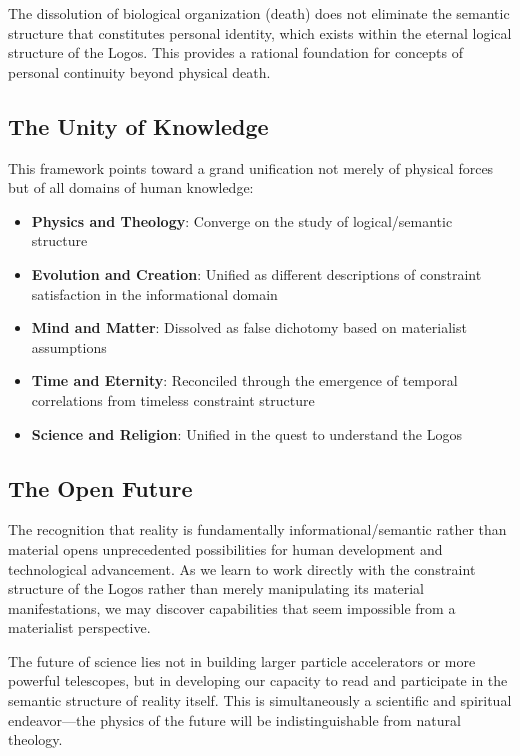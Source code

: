 \documentclass[12pt,a4paper]{article}
\begin{document}
The dissolution of biological organization (death) does not eliminate the semantic structure that constitutes personal identity, which exists within the eternal logical structure of the Logos. This provides a rational foundation for concepts of personal continuity beyond physical death.

\subsection{The Unity of Knowledge}

This framework points toward a grand unification not merely of physical forces but of all domains of human knowledge:

\begin{itemize}
    \item \textbf{Physics and Theology}: Converge on the study of logical/semantic structure
    \item \textbf{Evolution and Creation}: Unified as different descriptions of constraint satisfaction in the informational domain
    \item \textbf{Mind and Matter}: Dissolved as false dichotomy based on materialist assumptions
    \item \textbf{Time and Eternity}: Reconciled through the emergence of temporal correlations from timeless constraint structure
    \item \textbf{Science and Religion}: Unified in the quest to understand the Logos
\end{itemize}

\subsection{The Open Future}

The recognition that reality is fundamentally informational/semantic rather than material opens unprecedented possibilities for human development and technological advancement. As we learn to work directly with the constraint structure of the Logos rather than merely manipulating its material manifestations, we may discover capabilities that seem impossible from a materialist perspective.

The future of science lies not in building larger particle accelerators or more powerful telescopes, but in developing our capacity to read and participate in the semantic structure of reality itself. This is simultaneously a scientific and spiritual endeavor—the physics of the future will be indistinguishable from natural theology.
\end{document}

